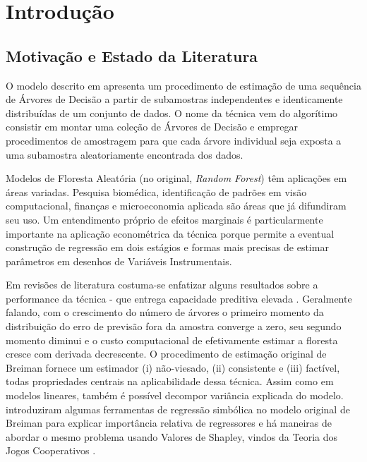 

\chapter{Introdução}
\label{cap:intro} %
\section{Motivação e Estado da Literatura}

O modelo descrito em  apresenta um procedimento de estimação de uma sequência de Árvores de Decisão a partir de subamostras independentes e identicamente distribuídas de um conjunto de dados. O nome da técnica vem do algorítimo consistir em montar uma coleção de Árvores de Decisão e empregar procedimentos de amostragem para que cada árvore individual seja exposta a uma subamostra aleatoriamente encontrada dos dados.

Modelos de Floresta Aleatória (no original, \textit{Random Forest}) têm aplicações em áreas variadas. Pesquisa biomédica, identificação de padrões em visão computacional, finanças e microeconomia aplicada são áreas que já difundiram seu uso. Um entendimento próprio de efeitos marginais é particularmente importante na aplicação econométrica da técnica porque permite a eventual construção de regressão em dois estágios e formas mais precisas de estimar parâmetros em desenhos de Variáveis Instrumentais.

Em revisões de literatura \cite{siroky2009navigating, biau2016random} costuma-se enfatizar alguns resultados sobre a performance da técnica - que entrega capacidade preditiva elevada \cite{gu2018empirical}. Geralmente falando, com o crescimento do número de árvores o primeiro momento da distribuição do erro de previsão fora da amostra converge a zero, seu segundo momento diminui e o custo computacional de efetivamente estimar a floresta cresce com derivada decrescente. O procedimento de estimação original de Breiman fornece um estimador (i) não-viesado, (ii) consistente e (iii) factível, todas propriedades centrais na aplicabilidade dessa técnica. Assim como em modelos lineares, também é possível decompor variância explicada do modelo.  introduziram algumas ferramentas de regressão simbólica no modelo original de Breiman para explicar importância relativa de regressores e há maneiras de abordar o mesmo problema usando Valores de Shapley, vindos da Teoria dos Jogos Cooperativos \cite{cohen2007feature}.


